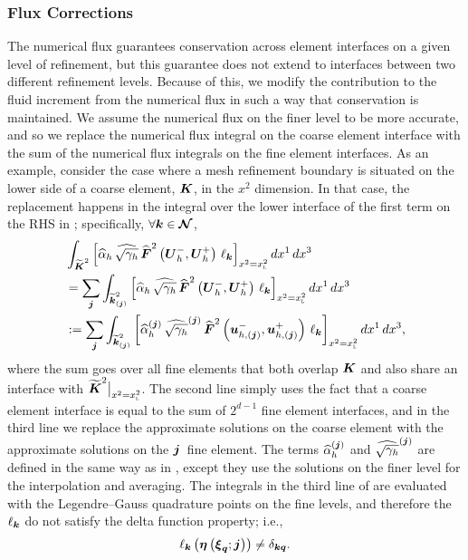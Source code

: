 \subsubsection{Flux Corrections}

The numerical flux guarantees conservation across element interfaces on a
given level of refinement, but this guarantee does not extend to interfaces
between two different refinement levels.
Because of this, we modify the contribution to the fluid increment
from the numerical flux in such a way that conservation is maintained.
We assume the numerical flux on the finer level to be more accurate,
and so we replace the numerical flux integral on the coarse element interface
with the sum of the numerical flux integrals on the fine element interfaces.
As an example, consider the case where a mesh refinement boundary is situated
on the lower side of a coarse element, $\boldsymbol{K}$, in the $x^{2}$ dimension.
In that case, the replacement happens in the integral over the lower interface
of the first term on the RHS in ;
specifically, $\forall\boldsymbol{k}\in\boldsymbol{\mathcal{N}}$,
\begin{align}
\begin{split}
  &\int_{\widetilde{\boldsymbol{K}}^{2}}
  \left[\widehat{\alpha}_{h}\,\widehat{\sqrt{\gamma_{h}}}\,
  \widehat{\boldsymbol{F}}^{2}\left(\boldsymbol{U}_{h}^{-},\boldsymbol{U}_{h}^{+}\right)\,
  \ell_{\boldsymbol{k}}
  \right]_{x^{2}=x^{2}_{\textsc{l}}}
  dx^{1}\,dx^{3}\\
  &=\sum\limits_{\boldsymbol{j}}
  \int_{\widetilde{\boldsymbol{k}}^{2}_{\left(\boldsymbol{j}\right)}}
  \left[\widehat{\alpha}_{h}\,\widehat{\sqrt{\gamma_{h}}}\,
  \widehat{\boldsymbol{F}}^{2}\left(\boldsymbol{U}_{h}^{-},\boldsymbol{U}_{h}^{+}\right)\,
  \ell_{\boldsymbol{k}}
  \right]_{x^{2}=x^{2}_{\textsc{l}}}
  dx^{1}\,dx^{3}\\
  &:=\sum\limits_{\boldsymbol{j}}
  \int_{\widetilde{\boldsymbol{k}}^{2}_{\left(\boldsymbol{j}\right)}}
  \left[\widehat{\alpha}^{\left(\boldsymbol{j}\right)}_{h}\,
  \widehat{\sqrt{\gamma_{h}}}^{\left(\boldsymbol{j}\right)}\,
  \widehat{\boldsymbol{F}}^{2}
  \left(\boldsymbol{u}_{h,\left(\boldsymbol{j}\right)}^{-},
  \boldsymbol{u}_{h,\left(\boldsymbol{j}\right)}^{+}\right)\,
  \ell_{\boldsymbol{k}}
  \right]_{x^{2}=x^{2}_{\textsc{l}}}
  dx^{1}\,dx^{3},
\end{split}
\label{eq.fluxCorrection}
\end{align}
where the sum goes over all fine elements that both overlap $\boldsymbol{K}$ and
also share an interface with $\widetilde{\boldsymbol{K}}^{2}\big|_{x^{2}=x^{2}_{\textsc{l}}}$.
The second line simply uses the fact that a coarse element interface
is equal to the sum of $2^{d-1}$ fine element interfaces,
and in the third line we replace the approximate solutions on the coarse
element with the approximate solutions on the $\boldsymbol{j}$\myth\ fine element.
The terms $\widehat{\alpha}_{h}^{\left(\boldsymbol{j}\right)}$ and
$\widehat{\sqrt{\gamma_{h}}}^{\left(\boldsymbol{j}\right)}$ are defined in the same way
as in , except they use the solutions on
the finer level for the interpolation and averaging.
The integrals in the third line of  are
evaluated with the Legendre--Gauss quadrature points on the fine
levels, and therefore the $\ell_{\boldsymbol{k}}$ do not
satisfy the delta function property; i.e.,
\begin{equation}
  \ell_{\boldsymbol{k}}\left(\boldsymbol{\eta}\left(\boldsymbol{\xi}_{\boldsymbol{q}};\boldsymbol{j}\right)\right)
  \neq\delta_{\boldsymbol{k}\boldsymbol{q}}.
\end{equation}

